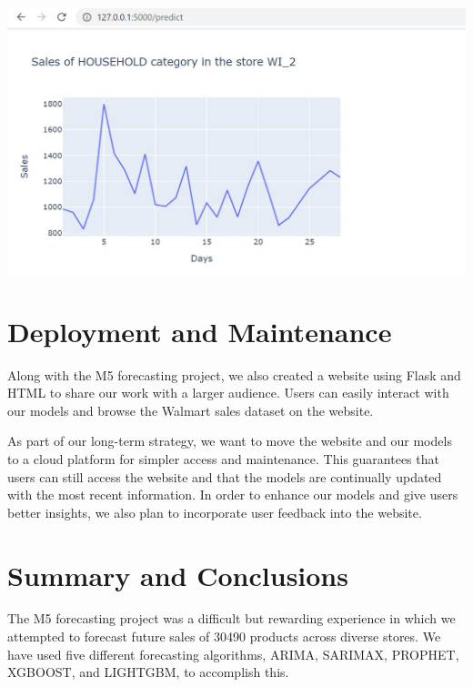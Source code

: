 \documentclass[fleqn,10pt]{SelfArx} %
\begin{document}
\includegraphics[scale=0.2]{4.jpeg}



\bigskip
\bigskip

\section{Deployment and Maintenance}
Along with the M5 forecasting project, we also created a website using Flask and HTML to share our work with a larger audience. Users can easily interact with our models and browse the Walmart sales dataset on the website.


\item As part of our long-term strategy, we want to move the website and our models to a cloud platform for simpler access and maintenance. This guarantees that users can still access the website and that the models are continually updated with the most recent information. In order to enhance our models and give users better insights, we also plan to incorporate user feedback into the website.

\bigskip
\bigskip

\section{Summary and Conclusions}

The M5 forecasting project was a difficult but rewarding experience in which we attempted to forecast future sales of 30490 products across diverse stores. We have used five different forecasting algorithms, ARIMA, SARIMAX, PROPHET, XGBOOST, and LIGHTGBM, to accomplish this.
\end{document}
